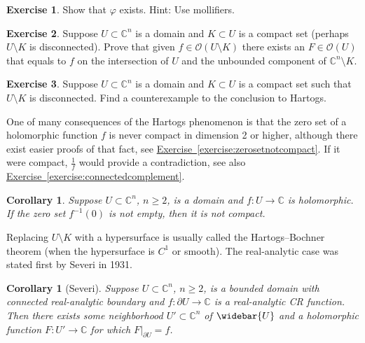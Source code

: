 \documentclass[12pt,openany]{book}
\newcommand{\C}{{\mathbb{C}}}
\newcommand{\sO}{{\mathscr{O}}}
\theoremstyle{plain}
\newtheorem{cor}[thm]{Corollary}
\theoremstyle{remark}
\theoremstyle{definition}
\newenvironment{exbox}{%
    \def\FrameCommand{\vrule width 1pt \relax\hspace{10pt}}%
    \MakeFramed{\advance\hsize-\width\FrameRestore}%
}{%
    \endMakeFramed
}
\theoremstyle{exercise}
\newtheorem{exercise}{Exercise}[section]
\theoremstyle{example}
\newcommand{\exerciseref}[1]{\hyperref[#1]{Exercise~\ref*{#1}}}
\begin{document}
\begin{exbox}
\begin{exercise}
Show that $\varphi$ exists.  Hint: Use mollifiers.
\end{exercise}

\begin{exercise}
Suppose $U \subset \C^n$ is a domain and
$K \subset U$ is a compact set (perhaps $U \setminus
K$ is disconnected).
Prove that given $f \in \sO(U \setminus K)$ there exists an $F \in \sO(U)$ that equals
to $f$ on the intersection of $U$ and the unbounded component
of $\C^n \setminus K$.
\end{exercise}

\begin{exercise}
Suppose $U \subset \C^n$ is a domain and
$K \subset U$ is a compact set such that $U \setminus K$ is disconnected.
Find a counterexample to the conclusion to Hartogs.
\end{exercise}
\end{exbox}

One of many consequences of the Hartogs phenomenon is
that
the zero set of a holomorphic function $f$ is never compact in
dimension 2 or higher, although there exist
easier proofs of that fact, see \exerciseref{exercise:zerosetnotcompact}.  If it
were compact, $\frac{1}{f}$ would provide a contradiction, see also
\exerciseref{exercise:connectedcomplement}.

\begin{cor}
Suppose $U \subset \C^n$, $n \geq 2$, is a domain and $f \colon U \to \C$ is
holomorphic.  If the zero set $f^{-1}(0)$ is not empty, then it is not compact.
\end{cor}

Replacing $U \setminus K$ with a hypersurface
is usually called the Hartogs--Bochner theorem (when the hypersurface is
$C^1$ or smooth).
The real-analytic case was stated first by Severi in 1931.

\begin{cor}[Severi]
Suppose $U \subset \C^n$, $n \geq 2$, is a bounded domain with connected real-analytic boundary and
$f \colon \partial U \to \C$ is a real-analytic CR function.  Then
there exists some neighborhood $U' \subset \C^n$ of $\widebar{U}$
and a holomorphic function $F \colon U' \to \C$ for which
$F|_{\partial U} = f$.
\end{cor}
\end{document}
